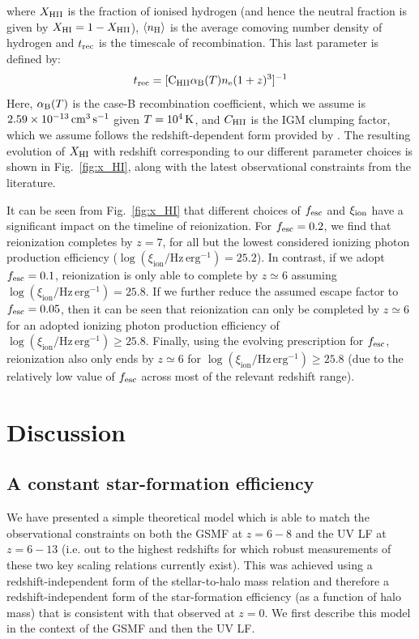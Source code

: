 \documentclass[fleqn,usenatbib]{mnras}
\begin{document}
\noindent
where $X_{\rm HII}$ is the fraction of ionised hydrogen (and hence the neutral fraction is given by $X_{\rm HI} = 1 - X_{\rm HII}$), $\langle n_{\rm H}\rangle$ is the average comoving number density of hydrogen and $t_{\rm rec}$ is the timescale of recombination. This last parameter is defined by:
\begin{equation}
    t_{\rm rec} = [\mathrm{C_{\rm HII}} \alpha_{\rm B}(T) n_{\rm e}(1+z)^3 ]^{-1}
\end{equation}
Here,  $\alpha_{\rm B}(T)$ is the case-B recombination coefficient, which we assume is $2.59\times10^{-13}\, \rm cm^{3}\,s^{-1}$ given $T=10^4 \, \rm K$, and $C_{\rm HII}$ is the IGM clumping factor, which we assume follows the redshift-dependent form provided by \citet{shull2012}. The resulting evolution of $X_{\rm HI}$ with redshift corresponding to our different parameter choices is shown in Fig.~\ref{fig:x_HI}, along with the latest observational constraints from the literature. 



It can be seen from Fig.~\ref{fig:x_HI} that different choices of $f_{\rm esc}$ and $\xi_{\rm ion}$ have a significant impact on the timeline of reionization. 
For $f_{\rm esc}=0.2$, we find that reionization completes by $z=7$, for all but the lowest considered ionizing photon production efficiency ($\log(\xi_{\mathrm{ion}}/ \mathrm{Hz\, erg^{-1}})=25.2$).
In contrast, if we adopt $f_{\rm esc}=0.1$, reionization is only able to complete by $z\simeq 6$ assuming $\log(\xi_{\mathrm{ion}}/ \mathrm{Hz\, erg^{-1}})=25.8$.
If we further reduce the assumed escape factor to $f_{\rm esc}=0.05$, then it can be seen that reionization can only be completed by $z\simeq 6$ for an adopted ionizing photon production efficiency of $\log(\xi_{\mathrm{ion}}/ \mathrm{Hz\, erg^{-1}})\geq25.8$. Finally, using the evolving prescription for $f_{\rm esc}$, reionization also only ends by $z\simeq 6$ for $\log(\xi_{\mathrm{ion}}/ \mathrm{Hz\, erg^{-1}})\geq25.8$ (due to the relatively low value of $f_{\rm esc}$ across most of the relevant redshift range).


\section{Discussion}
\label{sec:discussion}
\subsection{A constant star-formation efficiency}
\label{sec:cst_SF}
We have presented a simple theoretical model which is able to match the observational constraints on both the GSMF at $z=6-8$ and the UV LF at $z=6-13$ (i.e. out to the highest redshifts for which robust measurements of these two key scaling relations currently exist). This was achieved using a redshift-independent form of the stellar-to-halo mass relation and therefore a redshift-independent form of the star-formation efficiency (as a function of halo mass) that is consistent with that observed at $z=0$. We first describe this model in the context of the GSMF and then the UV LF.
\end{document}
